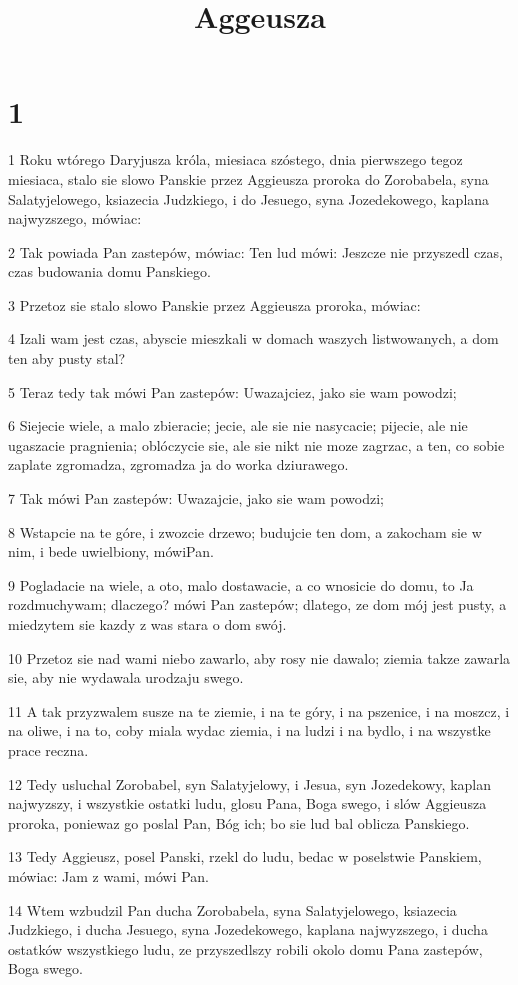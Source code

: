 

\title{Aggeusza}


\chapter{1}

\par 1 Roku wtórego Daryjusza króla, miesiaca szóstego, dnia pierwszego tegoz miesiaca, stalo sie slowo Panskie przez Aggieusza proroka do Zorobabela, syna Salatyjelowego, ksiazecia Judzkiego, i do Jesuego, syna Jozedekowego, kaplana najwyzszego, mówiac:
\par 2 Tak powiada Pan zastepów, mówiac: Ten lud mówi: Jeszcze nie przyszedl czas, czas budowania domu Panskiego.
\par 3 Przetoz sie stalo slowo Panskie przez Aggieusza proroka, mówiac:
\par 4 Izali wam jest czas, abyscie mieszkali w domach waszych listwowanych, a dom ten aby pusty stal?
\par 5 Teraz tedy tak mówi Pan zastepów: Uwazajciez, jako sie wam powodzi;
\par 6 Siejecie wiele, a malo zbieracie; jecie, ale sie nie nasycacie; pijecie, ale nie ugaszacie pragnienia; oblóczycie sie, ale sie nikt nie moze zagrzac, a ten, co sobie zaplate zgromadza, zgromadza ja do worka dziurawego.
\par 7 Tak mówi Pan zastepów: Uwazajcie, jako sie wam powodzi;
\par 8 Wstapcie na te góre, i zwozcie drzewo; budujcie ten dom, a zakocham sie w nim, i bede uwielbiony, mówiPan.
\par 9 Pogladacie na wiele, a oto, malo dostawacie, a co wnosicie do domu, to Ja rozdmuchywam; dlaczego? mówi Pan zastepów; dlatego, ze dom mój jest pusty, a miedzytem sie kazdy z was stara o dom swój.
\par 10 Przetoz sie nad wami niebo zawarlo, aby rosy nie dawalo; ziemia takze zawarla sie, aby nie wydawala urodzaju swego.
\par 11 A tak przyzwalem susze na te ziemie, i na te góry, i na pszenice, i na moszcz, i na oliwe, i na to, coby miala wydac ziemia, i na ludzi i na bydlo, i na wszystke prace reczna.
\par 12 Tedy usluchal Zorobabel, syn Salatyjelowy, i Jesua, syn Jozedekowy, kaplan najwyzszy, i wszystkie ostatki ludu, glosu Pana, Boga swego, i slów Aggieusza proroka, poniewaz go poslal Pan, Bóg ich; bo sie lud bal oblicza Panskiego.
\par 13 Tedy Aggieusz, posel Panski, rzekl do ludu, bedac w poselstwie Panskiem, mówiac: Jam z wami, mówi Pan.
\par 14 Wtem wzbudzil Pan ducha Zorobabela, syna Salatyjelowego, ksiazecia Judzkiego, i ducha Jesuego, syna Jozedekowego, kaplana najwyzszego, i ducha ostatków wszystkiego ludu, ze przyszedlszy robili okolo domu Pana zastepów, Boga swego.

